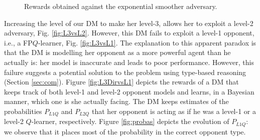 \begin{figure}

  
  \caption{Rewards obtained against the exponential smoother adversary. }
\end{figure}

Increasing the level of our DM to make her level-3, allows her to exploit a level-2 adversary, Fig. \ref{fig:L3vsL2}. However, this DM fails to exploit a level-1 opponent, i.e., a FP$Q$-learner, Fig. \ref{fig:L3vsL1}. The explanation to this apparent paradox is that the DM is modelling her opponent as a more powerful agent
than he actually is: her model is inaccurate and leads to poor performance.
However, this failure suggests a potential solution to the problem
using type-based reasoning (Section \ref{sec:com}). Figure \ref{fig:L3DirvsL1} depicts the rewards of a DM that keeps track of both level-1 and level-2 opponent models and learns, in a Bayesian manner, which one is she 
actually facing. The DM keeps estimates of the probabilities $P_{L1Q}$ and $P_{L2Q}$ that her opponent is acting as if he was a level-1 or a level-2 $Q$-learner, respectively. Figure \ref{fig:probas} depicts the evolution of $P_{L1Q}$: we observe that it places most of the probability in the correct opponent type. 





